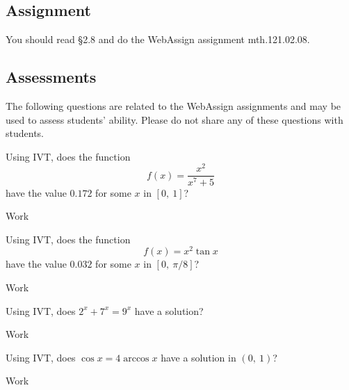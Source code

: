 \documentclass[12pt,addpoints, answers, fleqn]{exam}
\begin{document}
\subsection{Assignment}
You should read \S  2.8 and do the WebAssign assignment mth.121.02.08.

\vfill
\pagebreak


\begin{teacher}
\subsection{Assessments}
The following questions are related to the WebAssign assignments and may be used to assess students' ability. Please do not share any of these questions with students.
\begin{questions}		
\question 	%

Using IVT, does the function
\[
f\left(x\right) = \frac{x^2}{x^7 + 5}
\]
have the value $0.172$ for some $x$ in $\left[0, \ 1 \right]$?

\begin{solution}
Work
\end{solution}

\question 	%

Using IVT, does the function
\[
f\left(x\right) = x^2 \tan x
\]
have the value $0.032$ for some $x$ in $\left[0, \ \pi/8 \right]$?

\begin{solution}
Work
\end{solution}

\question 	%

Using IVT, does $2^x + 7^x = 9^x$ have a solution?

\begin{solution}
Work
\end{solution}

\question 	%

Using IVT, does $\cos x = 4 \arccos x$ have a solution in $\left(0, \ 1 \right)$?

\begin{solution}
Work
\end{solution}

\question 	%


\end{questions}
\end{teacher}
\end{document}
